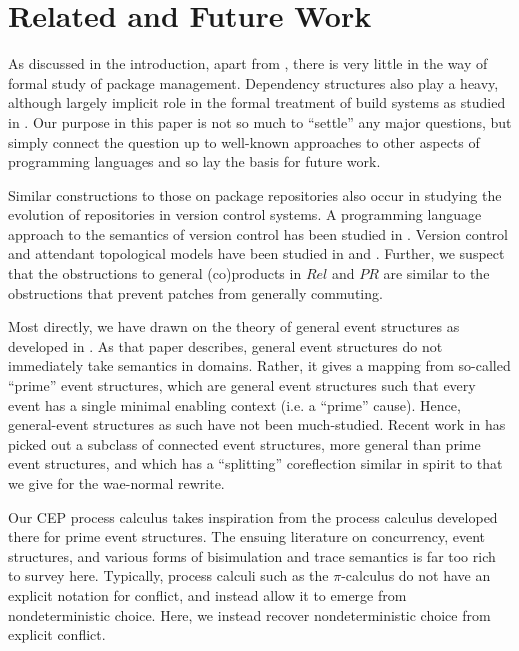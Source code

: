 \documentclass[hoptionsi,review,screen,format=sigconf]{acmart}
\theoremstyle{definition}
\newcommand{\PRb}{\mathit{PR}}
\newcommand{\Relb}{\mathit{Rel}}
\begin{document}
\section{Related and Future Work}

As discussed in the introduction, apart from \cite{di2006edos, abate2012dependency}, there is very little in the way of formal study of package management.  Dependency structures also play a heavy, although largely implicit role in the formal treatment of build systems as studied in \cite{mitchell:shake_24_sep_2018}. Our purpose in this paper is not so much to ``settle'' any major questions, but simply connect the question up to well-known approaches to other aspects of programming languages and so lay the basis for future work. 

Similar constructions to those on package repositories also occur in studying the evolution of repositories in version control systems. A programming language approach to the semantics of version control has been studied in \cite{swierstra2014semantics}. Version control and attendant topological models have been studied in \cite{angiuli2014homotopical} and \cite{mimram2013categorical}. Further, we suspect that the obstructions to general (co)products in \(\Relb\) and \(\PRb\) are similar to the obstructions that prevent patches from generally commuting.

Most directly, we have drawn on the theory of general event structures as developed in \cite{winskel1986event}. As that paper describes, general event structures do not immediately take semantics in domains. Rather, it gives a mapping from so-called ``prime'' event structures, which are general event structures such that every event has a single minimal enabling context (i.e. a ``prime'' cause). Hence, general-event structures as such have not been much-studied. Recent work in \cite{baldan2017domains} has picked out a subclass of connected event structures, more general than prime event structures, and which has a ``splitting'' coreflection similar in spirit to that we give for the wae-normal rewrite.

Our CEP process calculus takes inspiration from the process calculus developed there for prime event structures. The ensuing literature on concurrency, event structures, and various forms of bisimulation and trace semantics is far too rich to survey here. Typically, process calculi such as the \(\pi\)-calculus \cite{milner1992calculus} do not have an explicit notation for conflict, and instead allow it to emerge from nondeterministic choice. Here, we instead recover nondeterministic choice from explicit conflict. 
\end{document}
